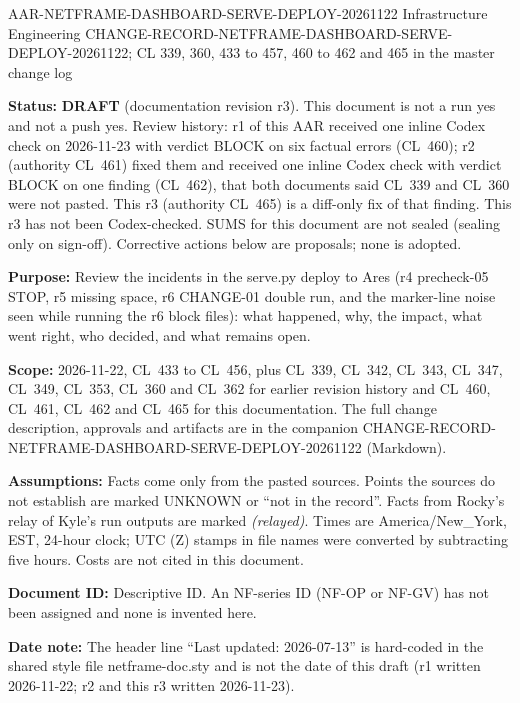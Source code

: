 \documentclass[10pt]{article}
\newcommand{\CL}[1]{CL~#1}
\newcommand{\relay}{\textit{(relayed)}}
\newcommand{\draftmark}{\textbf{\color{nfred}DRAFT}}
\begin{document}
%
{AAR-NETFRAME-DASHBOARD-SERVE-DEPLOY-20261122}%
{Infrastructure Engineering}%
{CHANGE-RECORD-NETFRAME-DASHBOARD-SERVE-DEPLOY-20261122; CL 339, 360, 433 to 457, 460 to 462 and 465 in the master change log}

\begin{docmeta}
\textbf{Status:} \draftmark{} (documentation revision r3). This document is not a run yes and not a push yes. Review history: r1 of this AAR received one inline Codex check on 2026-11-23 with verdict BLOCK on six factual errors (\CL{460}); r2 (authority \CL{461}) fixed them and received one inline Codex check with verdict BLOCK on one finding (\CL{462}), that both documents said \CL{339} and \CL{360} were not pasted. This r3 (authority \CL{465}) is a diff-only fix of that finding. This r3 has not been Codex-checked. SUMS for this document are not sealed (sealing only on sign-off). Corrective actions below are proposals; none is adopted.

\textbf{Purpose:} Review the incidents in the serve.py deploy to Ares (r4 precheck-05 STOP, r5 missing space, r6 CHANGE-01 double run, and the marker-line noise seen while running the r6 block files): what happened, why, the impact, what went right, who decided, and what remains open.

\textbf{Scope:} 2026-11-22, \CL{433} to \CL{456}, plus \CL{339}, \CL{342}, \CL{343}, \CL{347}, \CL{349}, \CL{353}, \CL{360} and \CL{362} for earlier revision history and \CL{460}, \CL{461}, \CL{462} and \CL{465} for this documentation. The full change description, approvals and artifacts are in the companion CHANGE-RECORD-NETFRAME-DASHBOARD-SERVE-DEPLOY-20261122 (Markdown).

\textbf{Assumptions:} Facts come only from the pasted sources. Points the sources do not establish are marked UNKNOWN or ``not in the record''. Facts from Rocky's relay of Kyle's run outputs are marked \relay{}. Times are America/New\_York, EST, 24-hour clock; UTC (Z) stamps in file names were converted by subtracting five hours. Costs are not cited in this document.

\textbf{Document ID:} Descriptive ID. An NF-series ID (NF-OP or NF-GV) has not been assigned and none is invented here.

\textbf{Date note:} The header line ``Last updated: 2026-07-13'' is hard-coded in the shared style file netframe-doc.sty and is not the date of this draft (r1 written 2026-11-22; r2 and this r3 written 2026-11-23).
\end{docmeta}
\end{document}
